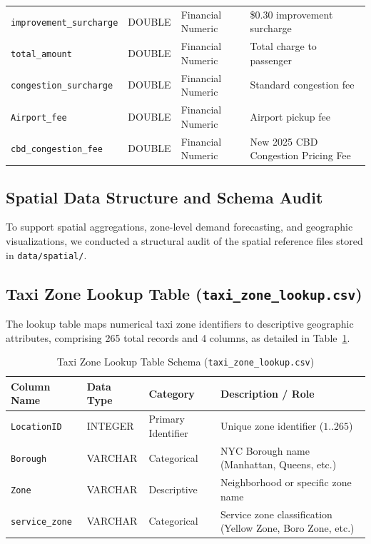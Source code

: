 \documentclass[11pt,a4paper]{article}
\begin{document}
\begin{table}[htbp]
\begin{tabularx}{\textwidth}{llXX}
\texttt{improvement\_surcharge} & DOUBLE & Financial Numeric & \$0.30 improvement surcharge \\
\texttt{total\_amount} & DOUBLE & Financial Numeric & Total charge to passenger \\
\texttt{congestion\_surcharge} & DOUBLE & Financial Numeric & Standard congestion fee \\
\texttt{Airport\_fee} & DOUBLE & Financial Numeric & Airport pickup fee \\
\texttt{cbd\_congestion\_fee} & DOUBLE & Financial Numeric & New 2025 CBD Congestion Pricing Fee \\
\bottomrule
\end{tabularx}
\end{table}

\subsection{Spatial Data Structure and Schema Audit}
To support spatial aggregations, zone-level demand forecasting, and geographic visualizations, we conducted a structural audit of the spatial reference files stored in \texttt{data/spatial/}.

\subsection{Taxi Zone Lookup Table (\texttt{taxi\_zone\_lookup.csv})}
The lookup table maps numerical taxi zone identifiers to descriptive geographic attributes, comprising 265 total records and 4 columns, as detailed in Table~\ref{tab:lookup_schema}.

\begin{table}[htbp]
\centering
\caption{Taxi Zone Lookup Table Schema (\texttt{taxi\_zone\_lookup.csv})}
\label{tab:lookup_schema}
\small
\begin{tabularx}{\textwidth}{llXX}
\toprule
\textbf{Column Name} & \textbf{Data Type} & \textbf{Category} & \textbf{Description / Role} \\
\midrule
\texttt{LocationID} & INTEGER & Primary Identifier & Unique zone identifier ($1..265$) \\
\texttt{Borough} & VARCHAR & Categorical & NYC Borough name (Manhattan, Queens, etc.) \\
\texttt{Zone} & VARCHAR & Descriptive & Neighborhood or specific zone name \\
\texttt{service\_zone} & VARCHAR & Categorical & Service zone classification (Yellow Zone, Boro Zone, etc.) \\
\bottomrule
\end{tabularx}
\end{table}
\end{document}
